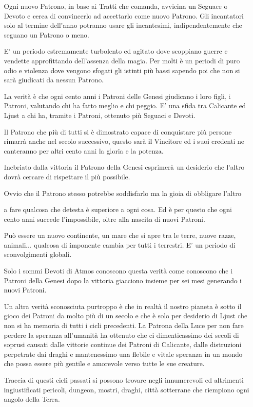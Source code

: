 \begin{multicols}{2}
Ogni nuovo Patrono, in base ai Tratti che comanda, avvicina un Seguace o Devoto e cerca di convincerlo ad accettarlo come nuovo Patrono. Gli incantatori solo al termine dell'anno potranno usare gli incantesimi, indipendentemente che seguano un Patrono o meno.

E' un periodo estremamente turbolento ed agitato dove scoppiano guerre e vendette approfittando dell'assenza della magia. Per molti è un periodi di puro odio e violenza dove vengono sfogati gli istinti più bassi sapendo poi che non si sarà giudicati da nessun Patrono.

La verità è che ogni cento anni i Patroni delle Genesi giudicano i loro figli, i Patroni, valutando chi ha fatto meglio e chi peggio. E' una sfida tra Calicante ed Ljust a chi ha, tramite i Patroni, ottenuto più Seguaci e Devoti.

Il Patrono che più di tutti si è dimostrato capace di conquistare più persone rimarrà anche nel secolo successivo, questo sarà il Vincitore ed i suoi credenti ne canteranno per altri cento anni la gloria e la potenza.

Inebriato dalla vittoria il Patrono della Genesi esprimerà un desiderio che l'altro dovrà cercare di rispettare il più possibile.

Ovvio che il Patrono stesso potrebbe soddisfarlo ma la gioia di obbligare l'altro

\begin{figure}

	\centering
\end{figure}

a fare qualcosa che detesta è superiore a ogni cosa. Ed è per questo che ogni cento anni succede l'impossibile, oltre alla nascita di nuovi Patroni.

Può essere un nuovo continente, un mare che si apre tra le terre, nuove razze, animali... qualcosa di imponente cambia per tutti i terrestri. E' un periodo di sconvolgimenti globali.

Solo i sommi Devoti di Atmos conoscono questa verità come conoscono che i Patroni della Genesi dopo la vittoria giacciono insieme per sei mesi generando i nuovi Patroni.

Un altra verità sconosciuta purtroppo è che in realtà il nostro pianeta è sotto il gioco dei Patroni da molto più di un secolo e che è solo per desiderio di Ljust che non si ha memoria di tutti i cicli precedenti. La Patrona della Luce per non fare perdere la speranza all'umanità ha ottenuto che ci dimenticassimo dei secoli di soprusi causati dalle vittorie continue dei Patroni di Calicante, dalle distruzioni perpetrate dai draghi e mantenessimo una flebile e vitale speranza in un mondo che possa essere più gentile e amorevole verso tutte le sue creature.

Traccia di questi cicli passati si possono trovare negli innumerevoli ed altrimenti ingiustificati pericoli, dungeon, mostri, draghi, città sotterrane che riempiono ogni angolo della Terra.

\end{multicols}

\pagebreak

